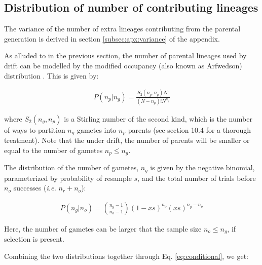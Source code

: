 \documentclass[review]{elsarticle}
\begin{document}

\subsection{Distribution of number of contributing lineages}
\label{subsec:distribution}

The variance of the number of extra lineages contributing from the parental generation is
derived in section \ref{subsec:apx:variance} of the appendix.

As alluded to in the previous section, the number of parental lineages used by drift can be modelled
by the modified occupancy (also known as Arfwedson) distribution \citep{Wakeley2009,ONeill2019,JohnsonEtAl2005}.
This is given by:

\begin{align}
  \label{eq:occupancy}
  P(n_p|n_g) = \frac{S_2(n_g,n_p) N!}{(N-n_p)! N^{n_g}}
\end{align}

where $S_2(n_g,n_p)$ is a Stirling number of the second kind, which is the number of ways to
partition $n_g$ gametes into $n_p$ parents (see \cite{JohnsonEtAl2005} section 10.4 for a thorough
treatment). Note that the under drift, the number of parents will be smaller or equal to the number
of gametes $n_p \le n_g$.

The distribution of the number of gametes, $n_g$ is given by the negative binomial, parameterized by
probability of resample $s$, and the total number of trials before $n_o$ successes (\textit{i.e.}
$n_r+n_o$):

\begin{align}
  \label{eq:neg-binomial-trials}
  P(n_g|n_o) = \binom{n_g-1}{n_o-1}(1-xs)^{n_o}(xs)^{n_g-n_o}
\end{align}

Here, the number of gametes can be larger that the sample size $n_o \le n_g$, if selection is
present.

Combining the two distributions together through Eq. \ref{eq:conditional}, we get:
\end{document}
